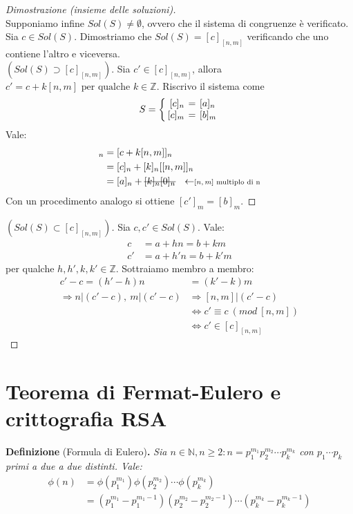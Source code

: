 \documentclass[12pt]{article}
\newcommand{\N}{\mathbb{N}}
\newcommand{\Z}{\mathbb{Z}}
\newcommand{\sesolose}{\Leftrightarrow}
\newcommand{\implica}{\Longrightarrow}
\newcommand{\pq}{\text{ per qualche }}
\renewcommand\qedsymbol{$\blacksquare$}
\newcommand{\stkout}[1]{\ifmmode\text{\sout{\ensuremath{#1}}}\else\sout{#1}\fi}
\begin{document}
\begin{proof}[Dimostrazione (insieme delle soluzioni)]\ \\
	Supponiamo infine $Sol(S) \ne \emptyset$, ovvero che il sistema di congruenze è verificato. Sia $c \in Sol(S)$. Dimostriamo che $Sol(S) = [c]_{[n,m]}$ verificando che uno contiene l'altro e viceversa.
	\\[1\baselineskip]$(Sol(S) \supset [c]_{[n,m]})$.
	Sia $ c' \in [c]_{[n,m]}$, allora $c' = c + k[n,m] \pq k \in \Z$. Riscrivo il sistema come
	\[
	S = \left\{
	\setlength\arraycolsep{2pt}
	\begin{array}{rcl} [c]_n & = & [a]_n \\ \relax
		[c]_m       & = & [b]_m
	\end{array}\right
	.
	\]
	Vale:
	\begin{align*}
		[c']_n & = [c + k[n,m]]_n                                                                         \\
		& = [c]_n + [k]_n [[n,m]]_n                                                                \\
		& = [a]_n + \stkout{[k]_n [0]_n} \ \ \leftarrow\scriptstyle{ \text{$[n,m]$ multiplo di n}}
	\end{align*}
	Con un procedimento analogo si ottiene $[c']_m = [b]_m$.
\end{proof}
\renewcommand\qedsymbol{$\blacksquare$}
\begin{proof}[$(Sol(S) \subset {[c]}_{[n,m]})$]
	Sia $c, c' \in Sol(S)$. Vale:
	\begin{align*}
		c  & = a+hn = b + km   \\
		c' & = a+h'n = b + k'm
	\end{align*}
	per qualche $h, h', k, k' \in \Z$. Sottraiamo membro a membro:
	\begin{align*}
		c' - c = (h' - h)n                & = (k' - k)m                            \\
		\implica n | (c' -c),\ m|(c' - c) & \implica [n, m]|(c' - c)               \\
		& \sesolose c' \equiv c \ (mod \ [n, m]) \\
		& \sesolose c' \in [c]_{[n,m]}
	\end{align*}
\end{proof}

\section{Teorema di Fermat-Eulero e crittografia RSA}
\textbf{Definizione} (Formula di Eulero)\textbf{.} \textit{Sia $n \in \N, n \ge 2: n = p^{m_1}_1 p^{m_2}_2 \cdots p^{m_k}_k$ con $p_1 \cdots p_k$ primi a due a due distinti. Vale:
\begin{align*}
	\phi(n) & = \phi(p^{m_1}_1)\phi(p^{m_2}_2) \cdots \phi(p^{m_k}_k)                                      \\
	& = (p^{m_1}_1 - p^{m_1 - 1}_1) (p^{m_2}_2 - p^{m_2 - 1}_2) \cdots (p^{m_k}_k - p^{m_k - 1}_k)
\end{align*}
}
\end{document}
